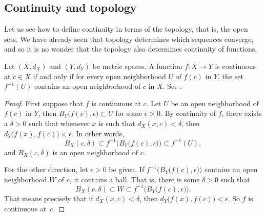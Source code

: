 \subsection{Continuity and topology}

Let us see how to define continuity in terms of the topology, that is,
the open sets.  We have already seen that topology determines which 
sequences converge, and so it is no wonder that the topology also
determines continuity of functions.

\begin{lemma} \label{lemma:mstopocontloc}
Let $(X,d_X)$ and $(Y,d_Y)$ be metric spaces.
A function $f \colon X \to Y$ is continuous at $c \in X$
if and only if for every open neighborhood $U$ of $f(c)$ in $Y$, the set
$f^{-1}(U)$ contains an open neighborhood of $c$ in $X$.
See .
\end{lemma}

\begin{myfigureht}
\caption{For every neighborhood $U$ of $f(c)$, the set $f^{-1}(U)$ contains an open
neighborhood $W$ of $c$.\label{fig:mscontfuncpt}}
\end{myfigureht}

\begin{proof}
First suppose that $f$ is continuous at $c$.
Let $U$ be an open neighborhood of $f(c)$
in $Y$, then $B_Y\bigl(f(c),\epsilon\bigr) \subset U$ for some $\epsilon >
0$.  By continuity of $f$, there exists a $\delta > 0$
such that whenever $x$ is such that $d_X(x,c) < \delta$, then
$d_Y\bigl(f(x),f(c)\bigr) < \epsilon$.  In other words,
\begin{equation*}
B_X(c,\delta) \subset f^{-1}\bigl(B_Y\bigl(f(c),\epsilon\bigr)\bigr) \subset
f^{-1}(U) ,
\end{equation*}
and $B_X(c,\delta)$ is an open neighborhood of $c$.

For the other direction,
let $\epsilon > 0$ be given.  If
$f^{-1}\bigl(B_Y\bigl(f(c),\epsilon\bigr)\bigr)$ contains an open
neighborhood $W$ of $c$, it contains a ball.  That is, there is some $\delta > 0$
such that
\begin{equation*}
B_X(c,\delta) \subset W \subset f^{-1}\bigl(B_Y\bigl(f(c),\epsilon\bigr)\bigr) .
\end{equation*}
That means precisely that if $d_X(x,c) < \delta$,
then $d_Y\bigl(f(x),f(c)\bigr) < \epsilon$.
So $f$ is continuous at~$c$.
\end{proof}

